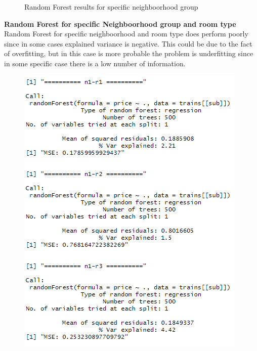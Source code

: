 \documentclass{FR16}
\begin{document}
\begin{figure}[!htb]
\begin{minipage}{0.48\textwidth}
   \end{minipage}
        \caption{ Random Forest results for specific neighboorhood group}\label{fig:14}

\end{figure}

\newpage
\noindent \textbf{Random Forest  for specific Neighboorhood group and room type}\\
Random Forest for specific neighboorhood and room type does perform poorly since in some cases explained variance is negative. This could be due to the fact of overfitting, but in this case is more probable the problem is underfitting since in some specific case there is a low number of information.
\begin{figure}[!htb]
   \begin{minipage}{0.33\textwidth}
     \centering
     \includegraphics[width=1\linewidth]{figures/rf2.png} 
   \end{minipage}\hfill
   \begin{minipage}{0.33\textwidth}

\end{minipage}
\end{figure}
\end{document}
